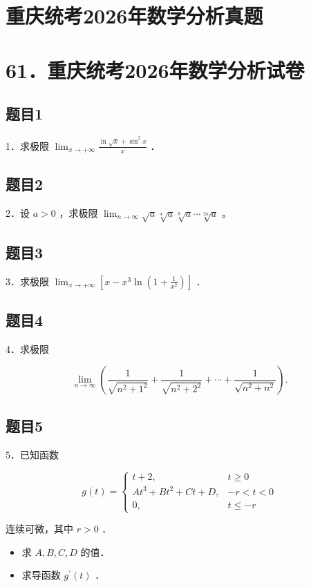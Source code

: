 \documentclass{article}
\begin{document}
\section*{重庆统考2026年数学分析真题}
\section*{61．重庆统考2026年数学分析试卷}

\subsection{题目1}
1．求极限 \(\lim _{x \rightarrow+\infty} \frac{\ln \sqrt{x}+\sin ^{2} x}{x}\) ．

\subsection{题目2}
2．设 \(a>0\) ，求极限 \(\lim _{n \rightarrow \infty} \sqrt{a} \sqrt[4]{a} \sqrt[8]{a} \cdots \sqrt[2 n]{a}\) 。

\subsection{题目3}
3．求极限 \(\lim _{x \rightarrow+\infty}\left[x-x^{3} \ln \left(1+\frac{1}{x^{2}}\right)\right]\) ．

\subsection{题目4}
4．求极限

\[
\lim _{n \rightarrow \infty}\left(\frac{1}{\sqrt{n^{2}+1^{2}}}+\frac{1}{\sqrt{n^{2}+2^{2}}}+\cdots+\frac{1}{\sqrt{n^{2}+n^{2}}}\right) .
\]

\subsection{题目5}
5．已知函数

\[
g(t)= \begin{cases}t+2, & t \geq 0 \\ A t^{3}+B t^{2}+C t+D, & -r<t<0 \\ 0, & t \leq-r\end{cases}
\]

连续可微，其中 \(r>0\) ．

\begin{itemize}
  \item[（1）] 求 \(A, B, C, D\) 的值．
  \item[（2）] 求导函数 \(g^{\prime}(t)\) ．
\end{itemize}
\end{document}
